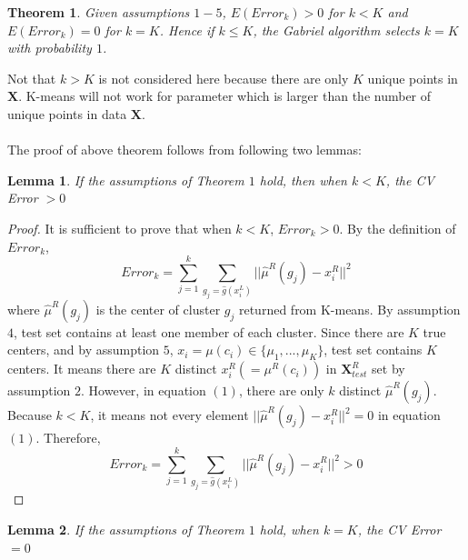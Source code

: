 \documentclass[11pt]{article}
\newtheorem{theorem}{Theorem}
\newtheorem{lemma}{Lemma}
\begin{document}
\begin{theorem}
Given assumptions $1-5$, $ E\left(Error_k\right) > 0$ for $k<K$ and  $ E\left(Error_k\right) = 0$ for $k=K$. Hence if $k \leq K$, the Gabriel algorithm selects $k=K$ with probability $1$.
\end{theorem}
\noindent
Not that $k > K$ is not considered here because there are only $K$ unique points in $\mathbf{X}$. K-means will not work for parameter which is larger than the number of unique points in data $\mathbf{X}$.\\\\ 
\noindent
The proof of above theorem follows from following two lemmas:
\begin{lemma}
	If the assumptions of Theorem $1$ hold, then when $k<K$, the CV Error $>0$
\end{lemma}
\begin{proof}
	It is sufficient to prove that when $k<K$,  $Error_k>0$. By the definition of $Error_k$,
\begin{equation}
Error_k = \sum^k_{j=1} \sum_{g_j = \hat{g} \left(x^L_i\right)} ||\hat{\mu}^R \left(g_j\right) - x^R_i||^2
\end{equation}
	where $\hat{\mu}^R \left(g_j\right)$ is the center of cluster $g_j$ returned from K-means. By assumption $4$, test set contains at least one member of each cluster. Since there are $K$ true centers, and by assumption $5$, $x_i = \mu \left(c_i\right) \in \{\mu_1,...,\mu_K\} $, test set contains $K$ centers. It means there are $K$ distinct $x^R_i \left(=\mu^R \left(c_i\right)\right)$ in $\mathbf{X}^R_{test}$ set by assumption $2$. However, in equation $(1)$, there are only $k$ distinct $\hat{\mu}^R \left(g_j\right)$.  Because $k < K$, it means not every element $||\hat{\mu}^R \left(g_j\right) - x^R_i||^2 = 0$ in equation $(1)$. Therefore,  $$Error_k = \sum^k_{j=1} \sum_{g_j = \hat{g} \left(x^L_i\right)} ||\hat{\mu}^R \left(g_j\right) - x^R_i||^2 > 0$$
\end{proof}
\begin{lemma}
	If the assumptions of Theorem $1$ hold, when $k=K$, the CV Error $=0$
\end{lemma}
\end{document}
